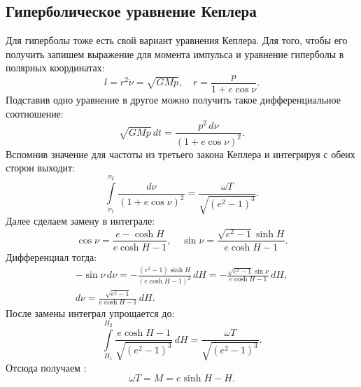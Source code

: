 \subsection{Гиперболическое уравнение Кеплера}

Для гиперболы тоже есть свой вариант уравнения Кеплера. Для того, чтобы его получить запишем выражение для момента импульса и уравнение гиперболы в полярных координатах:
\begin{equation*}
    l = r^2 \dot{\nu} = \sqrt{GMp}, \quad r = \frac{p}{1 + e \cos \nu}.
\end{equation*}
Подставив одно уравнение в другое можно получить такое дифференциальное соотношение:
\begin{equation*}
    \sqrt{GMp}\,dt=\frac{p^2 \,d\nu}{(1 + e \cos{\nu})^2}.
\end{equation*}
Вспомнив значение для частоты из третьего закона Кеплера и интегрируя с обеих сторон выходит:
\begin{equation*}
    \int\limits_{\nu_1}^{\nu_2}{\frac{d\nu}{(1+e\cos \nu)^2}} = \frac{\omega T}{\sqrt{(e^2 - 1)^3}}.
\end{equation*}
Далее сделаем замену в интеграле:
\begin{equation*}
    \cos \nu = \frac{e - \cosh H}{e \cosh H - 1}, \quad \sin \nu = \frac{\sqrt{e^2-1} \sinh H}{e \cosh H - 1}.
\end{equation*}
Дифференциал тогда:
\begin{gather*}
    -\sin \nu \, d \nu = -\frac{(e^2 - 1) \sinh H}{(e \cosh H - 1)^2}\,dH = -\frac{\sqrt{e^2-1}\sin \nu}{e \cosh H - 1}\,dH, \\
    d\nu = \frac{\sqrt{e^2-1}}{e \cosh H - 1}\,dH.
\end{gather*}
После замены интеграл упрощается до:
\begin{equation*}
    \int\limits_{H_1}^{H_2}{\frac{e \cosh H - 1}{\sqrt{(e^2-1)^3}} \,dH} = \frac{\omega T}{\sqrt{(e^2 - 1)^3}}.
\end{equation*}
Отсюда получаем :
\begin{equation}
    \omega T = M = e \sinh H - H.
\end{equation}
